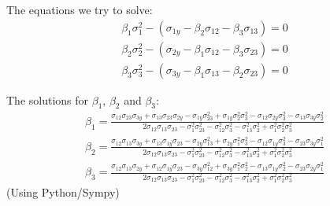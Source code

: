 \documentclass[11pt,a4paper]{article}
\begin{document}
The equations we try to solve:
\begin{eqnarray}
\beta_1 \sigma_{1}^2  - (\sigma_{1y} - \beta_2 \sigma_{12} - \beta_3 \sigma_{13}) = 0\\
\beta_2 \sigma_{2}^2  - (\sigma_{2y} - \beta_1 \sigma_{12} - \beta_3 \sigma_{23}) = 0\\
\beta_3 \sigma_{3}^2  - (\sigma_{3y} - \beta_1 \sigma_{13} - \beta_2 \sigma_{23}) = 0
\end{eqnarray}

The solutions for $\beta_1$, $\beta_2$ and $\beta_3$:
\begin{eqnarray}
\beta_1 = \frac{\sigma_{12}\sigma_{23}\sigma_{3y} + \sigma_{13}\sigma_{23}\sigma_{2y} - \sigma_{1y}\sigma_{23}^2 + \sigma_{1y}\sigma_{2}^2\sigma_{3}^2 - \sigma_{12}\sigma_{2y}\sigma_{3}^2 - \sigma_{13}\sigma_{3y}\sigma_{2}^2}{2\sigma_{12}\sigma_{13}\sigma_{23} - \sigma_{1}^2\sigma_{23}^2 - \sigma_{12}^2\sigma_{3}^2 - \sigma_{13}^2\sigma_{2}^2 + \sigma_{1}^2\sigma_{2}^2\sigma_{3}^2} \\
\beta_2 = \frac{\sigma_{12}\sigma_{13}\sigma_{3y} + \sigma_{13}\sigma_{1y}\sigma_{23} - \sigma_{2y}\sigma_{13}^2 + \sigma_{2y}\sigma_{1}^2\sigma_{3}^2 - \sigma_{12}\sigma_{1y}\sigma_{3}^2 - \sigma_{23}\sigma_{3y}\sigma_{1}^2}{2\sigma_{12}\sigma_{13}\sigma_{23} - \sigma_{1}^2\sigma_{23}^2 - \sigma_{12}^2\sigma_{3}^2 - \sigma_{13}^2\sigma_{2}^2 + \sigma_{1}^2\sigma_{2}^2\sigma_{3}^2} \\
\beta_3 = \frac{\sigma_{12}\sigma_{13}\sigma_{2y} + \sigma_{12}\sigma_{1y}\sigma_{23} - \sigma_{3y}\sigma_{12}^2 + \sigma_{3y}\sigma_{1}^2\sigma_{2}^2 - \sigma_{13}\sigma_{1y}\sigma_{2}^2 - \sigma_{23}\sigma_{2y}\sigma_{1}^2}{2\sigma_{12}\sigma_{13}\sigma_{23} - \sigma_{1}^2\sigma_{23}^2 - \sigma_{12}^2\sigma_{3}^2 - \sigma_{13}^2\sigma_{2}^2 + \sigma_{1}^2\sigma_{2}^2\sigma_{3}^2}
\end{eqnarray}
(Using Python/Sympy)
\end{document}
